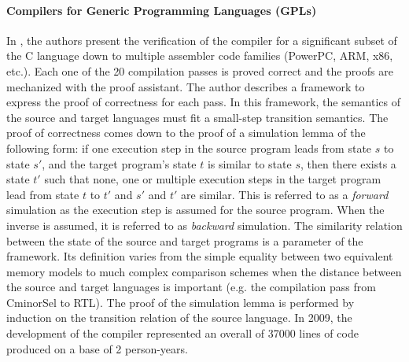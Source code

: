 \documentclass[pdflatex,sn-mathphys]{sn-jnl}%
\theoremstyle{thmstyleone}%
\theoremstyle{thmstyletwo}%
\theoremstyle{thmstylethree}%
\begin{document}
\paragraph{Compilers for Generic Programming Languages (GPLs)}

In \cite{Blazy2006, Leroy2009}, the authors present the verification
of the \ccert{} compiler for a significant subset of the C language
down to multiple assembler code families (PowerPC, ARM, x86,
etc.). Each one of the 20 compilation passes is proved correct and the
proofs are mechanized with the \coq{} proof assistant. The author
describes a framework to express the proof of correctness for each
pass. In this framework, the semantics of the source and target
languages must fit a small-step transition semantics. The proof of
correctness comes down to the proof of a simulation lemma of the
following form: if one execution step in the source program leads from
state $s$ to state $s'$, and the target program's state $t$ is similar
to state $s$, then there exists a state $t'$ such that none, one or
multiple execution steps in the target program lead from state $t$ to
$t'$ and $s'$ and $t'$ are similar. This is referred to as a
\textit{forward} simulation as the execution step is assumed for the
source program. When the inverse is assumed, it is referred to as
\textit{backward} simulation. The similarity relation between the
state of the source and target programs is a parameter of the
framework. Its definition varies from the simple equality between two
equivalent memory models to much complex comparison schemes when the
distance between the source and target languages is important
(e.g. the compilation pass from \textsf{CminorSel} to RTL). The proof
of the simulation lemma is performed by induction on the transition
relation of the source language. In 2009, the development of the
\ccert{} compiler represented an overall of 37000 lines of \coq{} code
produced on a base of 2 person-years.
\end{document}
